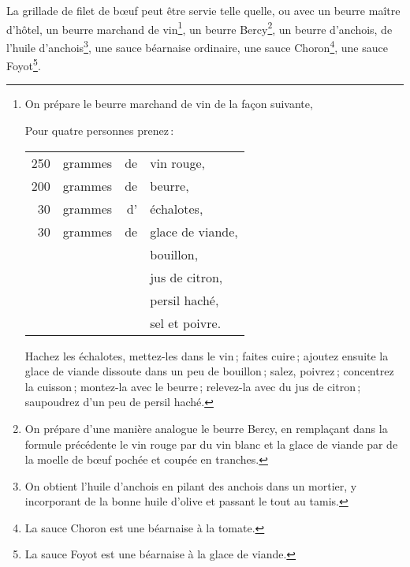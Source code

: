 La grillade de filet de bœuf peut être servie telle quelle, ou avec un beurre
maître d'hôtel, un beurre marchand de vin\footnote{On prépare le beurre
marchand de vin de la façon suivante,


\label{pg0453} \hypertarget{p0453}{}
\protect\endgraf
Pour quatre personnes prenez :
\protect\endgraf
\smallskip
\begin{longtable}{rrrp{16em}}
    250 & grammes & de & vin rouge,                                                                       \\
    200 & grammes & de & beurre,                                                                          \\
     30 & grammes & d' & échalotes,                                                                       \\
     30 & grammes & de & glace de viande,                                                                 \\
        &         &    & bouillon,                                                                        \\
        &         &    & jus de citron,                                                                   \\
        &         &    & persil haché,                                                                    \\
        &         &    & sel et poivre.                                                                   \\
\end{longtable}
\protect\endgraf

Hachez les échalotes, mettez-les dans le vin ; faites cuire ; ajoutez ensuite
la glace de viande dissoute dans un peu de bouillon ; salez, poivrez ;
concentrez la cuisson ; montez-la avec le beurre ; relevez-la avec du jus de
citron ; saupoudrez d'un peu de persil haché.}, un beurre Bercy\footnote{
On prépare d'une manière analogue le beurre Bercy, en remplaçant dans la
formule précédente le vin rouge par du vin blanc et la glace de viande par de
la moelle de bœuf pochée et coupée en tranches.}, un beurre d’anchois, de
l'huile d'anchois\footnote{On obtient l'huile d'anchois en pilant des anchois
dans un mortier, y incorporant de la bonne huile d'olive et passant le tout au
tamis.}, une sauce béarnaise ordinaire, une sauce Choron\footnote{La sauce
Choron est une béarnaise à la tomate.}, une sauce Foyot\footnote{La sauce Foyot
est une béarnaise à la glace de viande.}.

